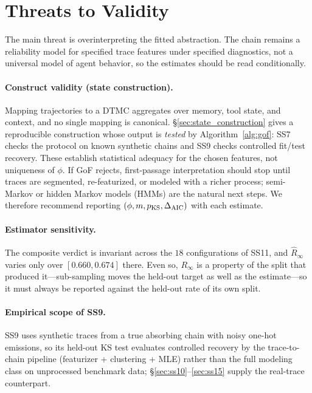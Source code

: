 \section{Threats to Validity}
\label{sec:threats}

The main threat is overinterpreting the fitted abstraction. The chain
remains a reliability model for specified trace features under
specified diagnostics, not a universal model of agent behavior, so the
estimates should be read conditionally.

\paragraph{Construct validity (state construction).}
Mapping trajectories to a DTMC aggregates over memory, tool state, and
context, and no single mapping is canonical.
\S\ref{sec:state_construction} gives a reproducible construction whose
output is \emph{tested} by Algorithm~\ref{alg:gof}: SS7 checks the
protocol on known synthetic chains and SS9 checks controlled fit/test
recovery. These establish statistical adequacy for the chosen features,
not uniqueness of $\phi$. If GoF rejects, first-passage interpretation
should stop until traces are segmented, re-featurized, or modeled with
a richer process; semi-Markov or hidden Markov models (HMMs) are the
natural next steps. We therefore recommend reporting
$(\phi, m, p_{\mathrm{KS}}, \Delta_{\rm AIC})$ with each estimate.

\paragraph{Estimator sensitivity.}
The composite verdict is invariant across the $18$ configurations of
SS11, and $\hat R_\infty$ varies only over $[0.660,0.674]$ there. Even
so, $R_\infty$ is a property of the split that produced it---sub-sampling
moves the held-out target as well as the estimate---so it must always be
reported against the held-out rate of its own split.

\paragraph{Empirical scope of SS9.}
SS9 uses synthetic traces from a true absorbing chain with noisy
one-hot emissions, so its held-out KS test evaluates controlled
recovery by the trace-to-chain pipeline (featurizer + clustering + MLE)
rather than the full modeling class on unprocessed benchmark data;
\S\ref{sec:ss10}--\ref{sec:ss15} supply the real-trace counterpart.

